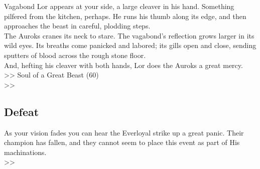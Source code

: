 Vagabond Lor appears at your side, a large cleaver in his hand. Something pilfered from the kitchen, perhaps. He runs his thumb along its edge, and then approaches the beast in careful, plodding steps.\\

The Auroks cranes its neck to stare. The vagabond’s reflection grows larger in its wild eyes. Its breaths come panicked and labored; its gills open and close, sending sputters of blood across the rough stone floor.\\

And, hefting his cleaver with both hands, Lor does the Auroks a great mercy.\\

>> Soul of a Great Beast (60)\\
>> 

\subsection*{Defeat}
As your vision fades you can hear the Everloyal strike up a great panic. Their champion has fallen, and they cannot seem to place this event as part of His machinations.\\
>> 